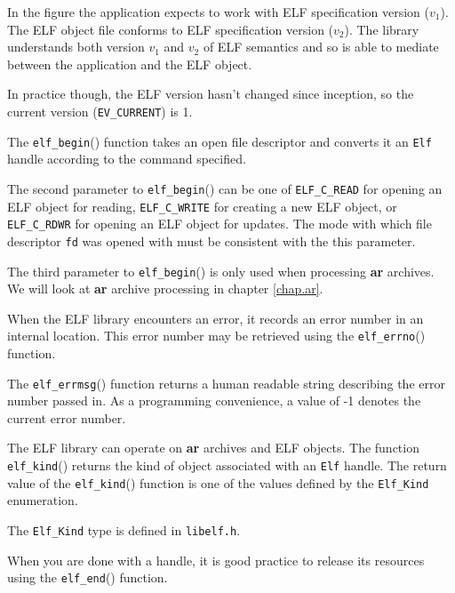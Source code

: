 \documentclass[a4paper]{book}
\makeatletter
\newcommand{\constant}[1]{\texttt{#1}}
\newcommand{\function}[1]{\texttt{#1}()}
\newcommand{\filename}[1]{\texttt{#1}}
\newcommand{\parameter}[1]{\texttt{#1}}
\newcommand{\tool}[1]{\textbf{#1}}
\newcommand{\type}[1]{\texttt{#1}}
\newenvironment{callout}[2][blue]{%
  \begingroup\newcommand{\@cocolor}{#1}%
  \newcommand{\@cogroup}[1]{#2}}{\endgroup}
\newcommand{\@co}[1]{\framebox{\textbf{\color{\@cocolor}#1}}}
\newcommand{\coref}[1]{%
  \hypertarget{\@cogroup.#1.cr}{%
    \hyperlink{\@cogroup.#1.co}{\@co{#1}}}}
\makeatother
\begin{document}
\begin{callout}{prog1}
\begin{description}
    In the figure  the application expects to
    work with ELF specification version ($v_1$). The ELF object file
    conforms to ELF specification version ($v_2$).  The library
    understands both version $v_1$ and $v_2$ of ELF semantics and so
    is able to mediate between the application and the ELF object.

    In practice though, the ELF version hasn't changed since
    inception, so the current version (\constant{EV\_CURRENT}) is 1.

  \item[\coref{5}] The \function{elf\_begin} function takes an open file
    descriptor and converts it an \type{Elf} handle according to the
    command specified.

    The second parameter to \function{elf\_begin} can be one of
    \constant{ELF\_C\_READ} for opening an ELF object for reading,
    \constant{ELF\_C\_WRITE} for creating a new ELF object, or
    \constant{ELF\_C\_RDWR} for opening an ELF object for updates.
    The mode with which file descriptor \parameter{fd} was opened with
    must be consistent with the this parameter.

    The third parameter to \function{elf\_begin} is only used when
    processing \tool{ar} archives.  We will look at \tool{ar} archive
    processing in chapter \vref{chap.ar}.

  \item[\coref{6}] When the ELF library encounters an error, it records
    an error number in an internal location.  This error number may be
    retrieved using the \function{elf\_errno} function.

    The \function{elf\_errmsg} function returns a human readable
    string describing the error number passed in.  As a programming
    convenience, a value of -1 denotes the current error number.

  \item[\coref{3} \coref{7}] The ELF library can operate on \tool{ar}
    archives and ELF objects.  The function \function{elf\_kind}
    returns the kind of object associated with an \type{Elf} handle.
    The return value of the \function{elf\_kind} function is one of
    the values defined by the \type{Elf\_Kind} enumeration.

    The \type{Elf\_Kind} type is defined in \filename{libelf.h}.

  \item[\coref{8}] When you are done with a handle, it is good practice
    to release its resources using the \function{elf\_end} function.
  \end{description}
\end{callout}
\end{document}
